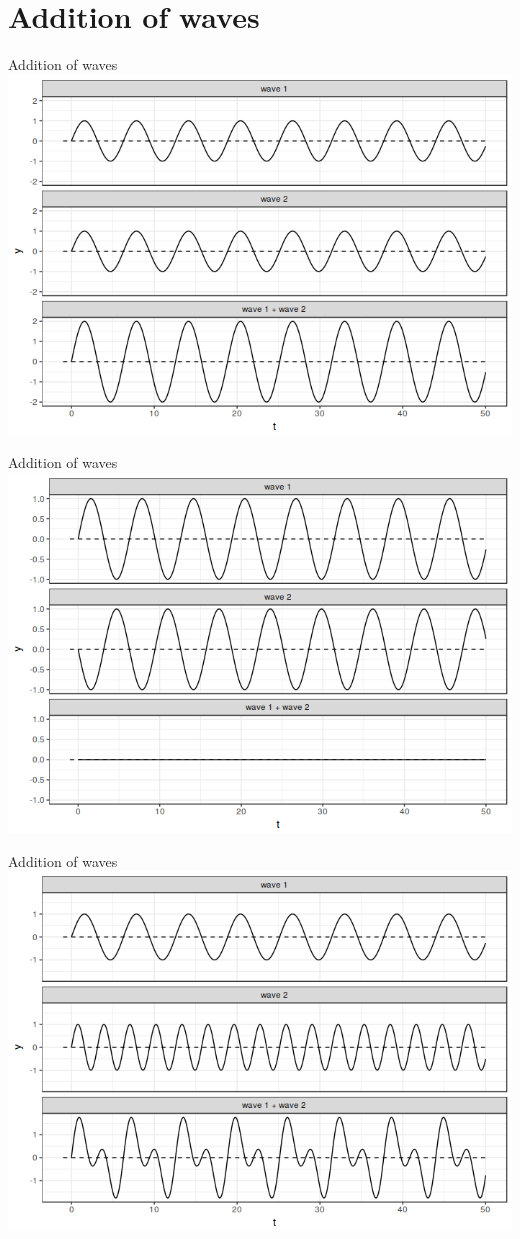 \section{Addition of waves}
\begin{frame}{Addition of waves}
\includegraphics[width=0.9\linewidth]{11-wave-addition.png}
\end{frame}

\begin{frame}{Addition of waves}
\includegraphics[width=0.9\linewidth]{12-wave-addition.png}
\end{frame}

\begin{frame}{Addition of waves}
\includegraphics[width=0.9\linewidth]{13-wave-addition.png}
\end{frame}

